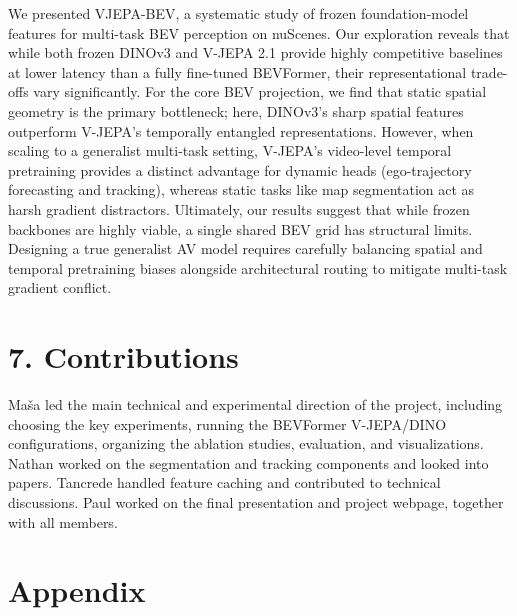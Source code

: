 \documentclass[12pt]{article}
\begin{document}
We presented VJEPA-BEV, a systematic study of frozen foundation-model features for multi-task BEV perception on nuScenes. Our exploration reveals that while both frozen DINOv3 and V-JEPA 2.1 provide highly competitive baselines at lower latency than a fully fine-tuned BEVFormer, their representational trade-offs vary significantly. For the core BEV projection, we find that static spatial geometry is the primary bottleneck; here, DINOv3's sharp spatial features outperform V-JEPA's temporally entangled representations. However, when scaling to a generalist multi-task setting, V-JEPA's video-level temporal pretraining provides a distinct advantage for dynamic heads (ego-trajectory forecasting and tracking), whereas static tasks like map segmentation act as harsh gradient distractors. Ultimately, our results suggest that while frozen backbones are highly viable, a single shared BEV grid has structural limits. Designing a true generalist AV model requires carefully balancing spatial and temporal pretraining biases alongside architectural routing to mitigate multi-task gradient conflict.
\section{7. Contributions}
Maša led the main technical and experimental direction of the project, including choosing the key experiments, running the BEVFormer V-JEPA/DINO configurations, organizing the ablation studies, evaluation, and visualizations. Nathan worked on the segmentation and tracking components and looked into papers. Tancrede handled feature caching and contributed to technical discussions. Paul worked on the final presentation and project webpage, together with all members.
\section*{Appendix}
 
\end{document}
